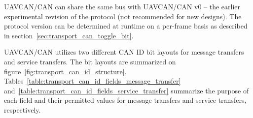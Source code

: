 UAVCAN/CAN can share the same bus with UAVCAN/CAN v0 -- the earlier experimental revision of the protocol
(not recommended for new designs).
The protocol version can be determined at runtime on a per-frame basis as described
in section~\ref{sec:transport_can_toggle_bit}.

UAVCAN/CAN utilizes two different CAN ID bit layouts for message transfers and service transfers.
The bit layouts are summarized on figure~\ref{fig:transport_can_id_structure}.
Tables~\ref{table:transport_can_id_fields_message_transfer} and~\ref{table:transport_can_id_fields_service_transfer}
summarize the purpose of each field and their permitted values
for message transfers and service transfers, respectively.

